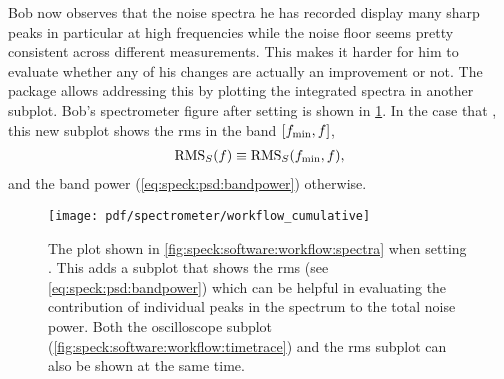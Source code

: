 Bob now observes that the noise spectra he has recorded display many sharp peaks in particular at high frequencies while the \oneoverf noise floor seems pretty consistent across different measurements.
This makes it harder for him to evaluate whether any of his changes are actually an improvement or not.
The \pyspeck package allows addressing this by plotting the integrated spectra in another subplot.
Bob's spectrometer figure after setting  is shown in \cref{fig:speck:software:workflow:cumulative}.
In the case that , this new subplot shows the \gls{rms} in the band $[f_{\mathrm{min}}, f]$,
\begin{align}\label{eq:speck:software:cumulative}
    \operatorname{RMS}_S(f)\equiv\operatorname{RMS}_S(f_{\mathrm{min}}, f),
\end{align}
and the band power (\cref{eq:speck:psd:bandpower}) otherwise.

\begin{figure}
    \centering
    \texttt{[image: pdf/spectrometer/workflow\_cumulative]}
    \caption{
        The \pyspeck plot shown in \cref{fig:speck:software:workflow:spectra} when setting .
        This adds a subplot that shows the \gls{rms} (see \cref{eq:speck:psd:bandpower}) which can be helpful in evaluating the contribution of individual peaks in the spectrum to the total noise power.
        Both the oscilloscope subplot (\cref{fig:speck:software:workflow:timetrace}) and the \gls{rms} subplot can also be shown at the same time.
    }
    \label{fig:speck:software:workflow:cumulative}
\end{figure}

